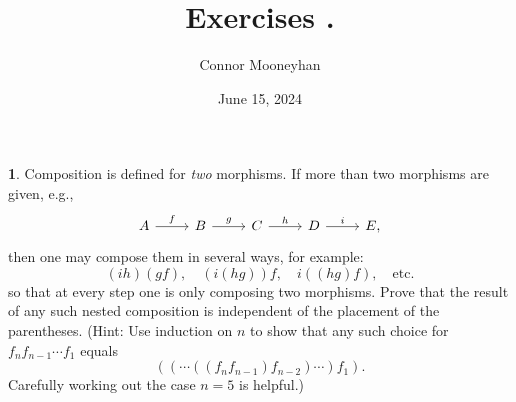 \documentclass{article}
\title{Exercises {\Roman{chapter}}.{\arabic{section}}}
\author{Connor Mooneyhan}
\date{June 15, 2024}
\theoremstyle{definition}
\newtheorem{ex}{}[section]
\begin{document}
\maketitle

\begin{ex}
	Composition is defined for \textit{two} morphisms.
	If more than two morphisms are given, e.g., \begin{equation*}
		\begin{tikzcd}
			A \arrow[r, "f"] & B \arrow[r, "g"] & C \arrow[r, "h"] & D \arrow[r, "i"] & E,
		\end{tikzcd}
	\end{equation*}
	then one may compose them in several ways, for example: \begin{equation*}
		(ih)(gf), \hspace{1em} (i(hg))f, \hspace{1em} i((hg)f), \hspace{1em} \mathrm{etc.}
	\end{equation*}
	so that at every step one is only composing two morphisms.
	Prove that the result of any such nested composition is independent of the placement of the parentheses.
	(Hint: Use induction on $n$ to show that any such choice for $f_nf_{n-1}\cdots f_1$ equals \begin{equation*}
		((\cdots((f_nf_{n-1})f_{n-2})\cdots)f_1).
	\end{equation*}
	Carefully working out the case $n = 5$ is helpful.)
\end{ex}
\end{document}
